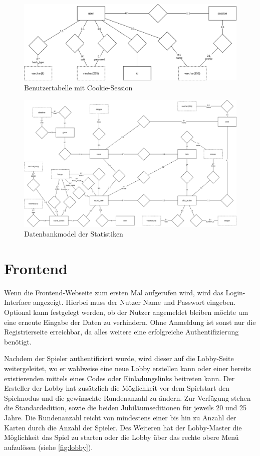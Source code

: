 \begin{figure}[h]
	\includegraphics[width=\textwidth]{images/user-db.png}
	\caption{Benutzertabelle mit Cookie-Session}
	\label{fig:user-db}
\end{figure}

\begin{figure}
	\includegraphics[width=\textheight]{images/statistics-db.png}
	\caption{Datenbankmodel der Statistiken}
	\label{fig:statistics-db}
\end{figure}

\section{Frontend}
Wenn die Frontend-Webseite zum ersten Mal aufgerufen wird, wird das Login-Interface angezeigt. Hierbei muss der Nutzer Name und Passwort eingeben. Optional kann festgelegt werden, ob der Nutzer angemeldet bleiben möchte um eine erneute Eingabe der Daten zu verhindern. Ohne Anmeldung ist sonst nur die Registrierseite erreichbar, da alles weitere eine erfolgreiche Authentifizierung benötigt.

Nachdem der Spieler authentifiziert wurde, wird dieser auf die Lobby-Seite weitergeleitet, wo er wahlweise eine neue Lobby erstellen kann oder einer bereits existierenden mittels eines Codes oder Einladungslinks beitreten kann. Der Ersteller der Lobby hat zusätzlich die Möglichkeit vor dem Spielstart den Spielmodus und die gewünschte Rundenanzahl zu ändern. Zur Verfügung stehen die Standardedition, sowie die beiden Jubiläumseditionen für jeweils 20 und 25 Jahre. Die Rundenanzahl reicht von mindestens einer bis hin zu Anzahl der Karten durch die Anzahl der Spieler. Des Weiteren hat der Lobby-Master die Möglichkeit das Spiel zu starten oder die Lobby über das rechte obere Menü aufzulösen (siehe \cref{fig:lobby}).

